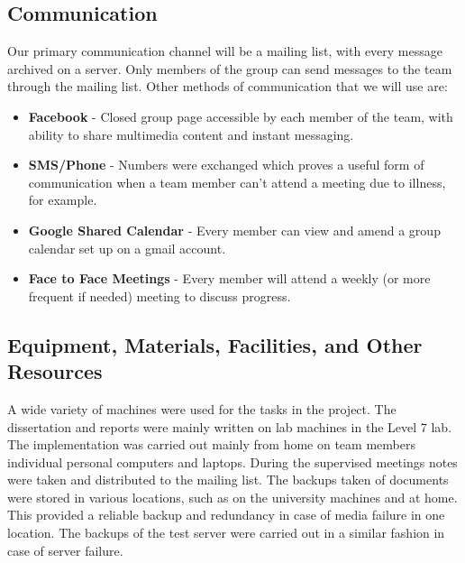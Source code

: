 \documentclass{l3proj}
\begin{document}
\subsection{Communication} Our primary communication channel will be a mailing
list, with every message archived on a server. Only members of the group can
send messages to the team through the mailing list. Other methods of
communication that we will use are: \begin{itemize} \item \textbf{Facebook} -
Closed group page accessible by each member of the team, with ability to share
multimedia content and instant messaging.  \item \textbf{SMS/Phone} - Numbers
were exchanged which proves a useful form of communication when a team member
can't attend a meeting due to illness, for example.  \item \textbf{Google Shared
Calendar} - Every member can view and amend a group calendar set up on a gmail
account.  \item \textbf{Face to Face Meetings} - Every member will attend a
weekly (or more frequent if needed) meeting to discuss progress.  \end{itemize}

\subsection{Equipment, Materials, Facilities, and Other Resources} A wide
variety of machines were used for the tasks in the project. The dissertation and
reports were mainly written on lab machines in the Level 7 lab.  The
implementation was carried out mainly from home on team members individual
personal computers and laptops. \newline During the supervised meetings notes
were taken and distributed to the mailing list.  The backups taken of documents
were stored in various locations, such as on the university machines and at
home. This provided a reliable backup and redundancy in case of media failure in
one location. The backups of the test server were carried out in a similar
fashion in case of server failure.
\end{document}
